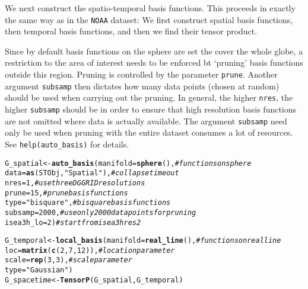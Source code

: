 \documentclass{article}\usepackage[]{graphicx}\usepackage[]{color}
\makeatletter
\newcommand{\hlnum}[1]{\textcolor[rgb]{0.686,0.059,0.569}{#1}}%
\newcommand{\hlstr}[1]{\textcolor[rgb]{0.192,0.494,0.8}{#1}}%
\newcommand{\hlcom}[1]{\textcolor[rgb]{0.678,0.584,0.686}{\textit{#1}}}%
\newcommand{\hlstd}[1]{\textcolor[rgb]{0.345,0.345,0.345}{#1}}%
\newcommand{\hlkwb}[1]{\textcolor[rgb]{0.69,0.353,0.396}{#1}}%
\newcommand{\hlkwc}[1]{\textcolor[rgb]{0.333,0.667,0.333}{#1}}%
\newcommand{\hlkwd}[1]{\textcolor[rgb]{0.737,0.353,0.396}{\textbf{#1}}}%
\newenvironment{kframe}{%
 \def\at@end@of@kframe{}%
 \ifinner\ifhmode%
  \def\at@end@of@kframe{\end{minipage}}%
  \begin{minipage}{\columnwidth}%
 \fi\fi%
 \def\FrameCommand##1{\hskip\@totalleftmargin \hskip-\fboxsep
 \colorbox{shadecolor}{##1}\hskip-\fboxsep
     \hskip-\linewidth \hskip-\@totalleftmargin \hskip\columnwidth}%
 \MakeFramed {\advance\hsize-\width
   \@totalleftmargin\z@ \linewidth\hsize
   \@setminipage}}%
 {\par\unskip\endMakeFramed%
 \at@end@of@kframe}
\newenvironment{knitrout}{}{} %
\renewcommand{\tt} {\texttt}
\makeatother
\begin{document}
\vspace{0.1in}

 We next construct the spatio-temporal basis functions. This proceeds in exactly the same way as in the \tt{NOAA} dataset: We first construct spatial basis functions, then temporal basis functions, and then we find their tensor product.

Since by default basis functions on the sphere are set the cover the whole globe, a restriction to the area of interest needs to be enforced bt `pruning' basis functions outside this region. Pruning is controlled by the parameter \tt{prune}. Another argument \tt{subsamp} then dictates how many data points (chosen at random) should be used when carrying out the pruning. In general, the higher \tt{nres}, the higher \tt{subsamp} should be in order to ensure that high resolution basis functions are not omitted where data is actually available. The argument \tt{subsamp} need only be used when pruning with the entire dataset consumes a lot of resources. See \tt{help(auto\_basis)} for details.

\begin{knitrout}
\color{fgcolor}\begin{kframe}
\begin{alltt}
\hlstd{G_spatial} \hlkwb{<-} \hlkwd{auto_basis}\hlstd{(}\hlkwc{manifold} \hlstd{=} \hlkwd{sphere}\hlstd{(),}      \hlcom{# functions on sphere}
                        \hlkwc{data}\hlstd{=}\hlkwd{as}\hlstd{(STObj,}\hlstr{"Spatial"}\hlstd{),} \hlcom{# collapse time out}
                        \hlkwc{nres} \hlstd{=} \hlnum{1}\hlstd{,}                 \hlcom{# use three DGGRID resolutions}
                        \hlkwc{prune}\hlstd{=} \hlnum{15}\hlstd{,}                 \hlcom{# prune basis functions}
                        \hlkwc{type} \hlstd{=} \hlstr{"bisquare"}\hlstd{,}        \hlcom{# bisquare basis functions}
                        \hlkwc{subsamp} \hlstd{=} \hlnum{2000}\hlstd{,}          \hlcom{# use only 2000 data points for pruning}
                        \hlkwc{isea3h_lo} \hlstd{=} \hlnum{2}\hlstd{)}            \hlcom{# start from isea3h res 2}

\hlstd{G_temporal} \hlkwb{<-} \hlkwd{local_basis}\hlstd{(}\hlkwc{manifold}\hlstd{=}\hlkwd{real_line}\hlstd{(),}      \hlcom{# functions on real line}
                          \hlkwc{loc} \hlstd{=} \hlkwd{matrix}\hlstd{(}\hlkwd{c}\hlstd{(}\hlnum{2}\hlstd{,}\hlnum{7}\hlstd{,}\hlnum{12}\hlstd{)),}   \hlcom{# location parameter}
                          \hlkwc{scale} \hlstd{=} \hlkwd{rep}\hlstd{(}\hlnum{3}\hlstd{,}\hlnum{3}\hlstd{),}          \hlcom{# scale parameter}
                          \hlkwc{type} \hlstd{=} \hlstr{"Gaussian"}\hlstd{)}
\hlstd{G_spacetime} \hlkwb{<-} \hlkwd{TensorP}\hlstd{(G_spatial,G_temporal)}
\end{alltt}
\end{kframe}
\end{knitrout}
\end{document}
